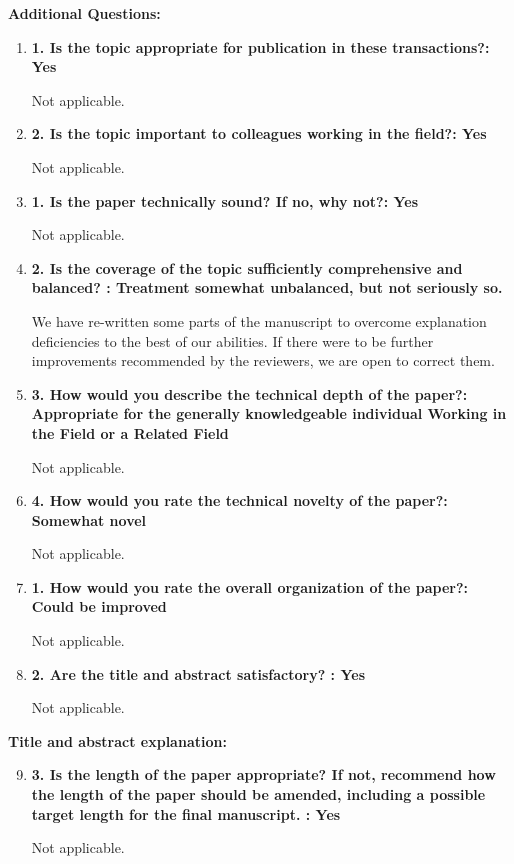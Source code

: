 \documentclass[12pt]{article}
\begin{document}
\textbf{Additional Questions:}

\begin{enumerate}

\item \textbf{1. Is the topic appropriate for publication in these transactions?: Yes}

Not applicable.

\item \textbf{2. Is the topic important to colleagues working in the field?: Yes}

Not applicable.

\item \textbf{1. Is the paper technically sound? If no, why not?: Yes}

Not applicable.

\item \textbf{2. Is the coverage of the topic sufficiently comprehensive and balanced? : 
Treatment somewhat unbalanced, but not seriously so.}

We have re-written some parts of the manuscript to overcome explanation deficiencies to 
the best of our abilities. If there 
were to be further improvements recommended by the reviewers, we are open to correct 
them.

\item \textbf{3. How would you describe the technical depth of the paper?: Appropriate 
for the generally knowledgeable individual Working in the Field or a Related Field}

Not applicable.

\item \textbf{4. How would you rate the technical novelty of the paper?: Somewhat novel}

Not applicable.

\item \textbf{1. How would you rate the overall organization of the paper?: Could be 
improved}

Not applicable.

\item \textbf{2. Are the title and abstract satisfactory? : Yes}

Not applicable.

\end{enumerate}

\textbf{Title and abstract explanation:}


\begin{enumerate}
\setcounter{enumi}{8}
\item \textbf{3. Is the length of the paper appropriate? If not, recommend how the length 
of the paper should be amended, including a possible target length for the final 
manuscript. : Yes}

Not applicable.

\end{enumerate}
\end{document}
